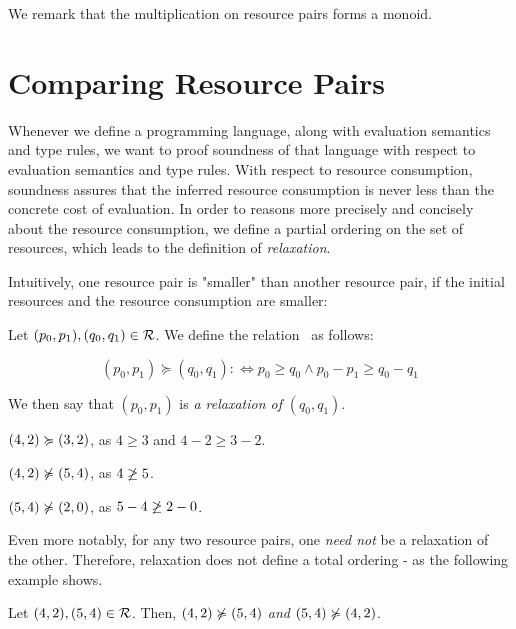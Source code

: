 We remark that the multiplication on resource pairs forms a monoid.

\section{Comparing Resource Pairs}

Whenever we define a programming language, along with evaluation semantics and type rules, we want to proof soundness of that language with respect to evaluation semantics and type rules. With respect to resource consumption, soundness assures that the inferred resource consumption is never less than the concrete cost of evaluation. In order to reasons more precisely and concisely about the resource consumption, we define a partial ordering on the set of resources, which leads to the definition of \emph{relaxation}.

Intuitively, one resource pair is "smaller" than another resource pair, if the initial resources and the resource consumption are smaller:

\begin{definition}[Relaxation]\label{def:relaxation}
   Let \((p_0, p_1), (q_0, q_1) \in \mathcal{R}\). We define the relation \relaxation ~as follows:

   \[
      (p_0, p_1) \succcurlyeq (q_0, q_1) :\iff p_0 \geq q_0 \wedge p_0 - p_1 \geq q_0 - q_1
   \]
\end{definition}

We then say that \((p_0, p_1)\) is \emph{a relaxation of} \((q_0, q_1)\).

\begin{example}
   \((4, 2) \succcurlyeq (3, 2)\), as \(4 \geq 3\) and \(4 - 2 \geq 3 - 2\).
\end{example}

\begin{example}
   \((4,2) \notrelaxation (5, 4)\), as \(4 \centernot \geq 5\).
\end{example}

\begin{example}
   \((5, 4) \notrelaxation (2, 0)\), as \(5 - 4 \centernot{\geq} 2 - 0\).
\end{example}

Even more notably, for any two resource pairs, one \emph{need not} be a relaxation of the other. Therefore, relaxation does not define a total ordering - as the following example shows.

\begin{example}
   Let \((4,2), (5,4) \in \mathcal{R}\). Then, \((4,2) \notrelaxation (5,4)\) \emph{and} \((5,4) \notrelaxation (4,2)\).
\end{example}

